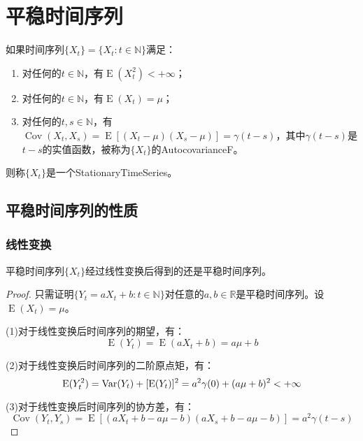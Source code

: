 \section{平稳时间序列}

\begin{definition}
	如果时间序列$\{X_t\}=\{X_t:t\in\mathbb{N}\}$满足：
	\begin{enumerate}
		\item 对任何的$t\in\mathbb{N}$，有$\operatorname{E}(X_t^2)<+\infty$；
		\item 对任何的$t\in\mathbb{N}$，有$\operatorname{E}(X_t)=\mu$；
		\item 对任何的$t,s\in\mathbb{N}$，有$\operatorname{Cov}(X_t,X_s)=\operatorname{E}[(X_t-\mu)(X_s-\mu)]=\gamma(t-s)$，其中$\gamma(t-s)$是$t-s$的实值函数，被称为$\{X_t\}$的\gls{AutocovarianceF}。
	\end{enumerate}
	则称$\{X_t\}$是一个\gls{StationaryTimeSeries}。
\end{definition}

\subsection{平稳时间序列的性质}
\subsubsection{线性变换}
\begin{theorem}
	平稳时间序列$\{X_t\}$经过线性变换后得到的还是平稳时间序列。
\end{theorem}
\begin{proof}
	只需证明$\{Y_t=aX_t+b:t\in\mathbb{N}\}$对任意的$a,b\in\mathbb{R}$是平稳时间序列。设$\operatorname{E}(X_t)=\mu$。\par
	(1)对于线性变换后时间序列的期望，有：
	\begin{equation*}
		\operatorname{E}(Y_t)=\operatorname{E}(aX_t+b)=a\mu+b
	\end{equation*}\par
	(2)对于线性变换后时间序列的二阶原点矩，有：
	\begin{equation*}
		\operatorname{E}(Y_t^2)=\operatorname{Var}(Y_t)+[\operatorname{E}(Y_t)]^2=a^2\gamma(0)+(a\mu+b)^2<+\infty\qedhere
	\end{equation*}\par
	(3)对于线性变换后时间序列的协方差，有：
	\begin{equation*}
		\operatorname{Cov}(Y_t,Y_s)=\operatorname{E}[(aX_t+b-a\mu-b)(aX_s+b-a\mu-b)]=a^2\gamma(t-s)
	\end{equation*}
\end{proof}
